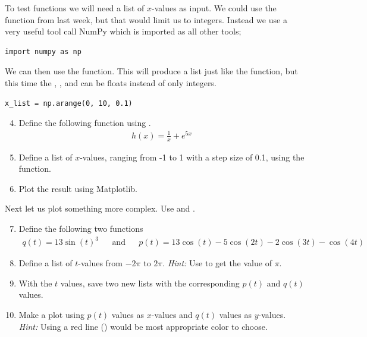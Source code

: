 \documentclass{article}
\begin{document}
To test functions we will need a list of $x$-values as input.
We could use the  function from last week, but that would limit us to integers. Instead we use a very useful tool call NumPy which is imported as all other tools;

\begin{lstlisting}
import numpy as np
\end{lstlisting}

We can then use the  function.
This will produce a list just like the  function, but this time the
,
, and
can be floats instead of only integers.

\begin{lstlisting}
x_list = np.arange(0, 10, 0.1)
\end{lstlisting}

\begin{enumerate}
  \setcounter{enumi}{3}
  \item Define the following function using .
    \begin{align}
        h(x) = \frac{1}{x} + e^{5x}
    \end{align}

  \item Define a list of $x$-values, ranging from -1 to 1 with a step size of 0.1, using the  function.

  \item Plot the result using Matplotlib.

\end{enumerate}

Next let us plot something more complex. Use  and .

\begin{enumerate}
    \setcounter{enumi}{6}
    \item Define the following two functions
    \begin{align}
        q(t) = 13\sin(t)^3 && \text{and} && p(t) = 13\cos(t) - 5 \cos(2t) - 2 \cos(3t) - \cos(4t)
    \end{align}

    \item Define a list of $t$-values from $-2\pi$ to $2\pi$.
      {\em Hint:} Use  to get the value of $\pi$.

    \item With the $t$ values, save two new lists with the corresponding $p(t)$ and $q(t)$ values.

    \item Make a plot using $p(t)$ values as $x$-values and $q(t)$ values as $y$-values.
        {\em Hint:} Using a red line () would be most appropriate color to choose.


\end{enumerate}
\end{document}
